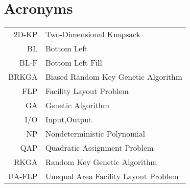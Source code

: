 \documentclass[english,master,unicode]{ctufit-thesis}
\theoremstyle{plain}
\theoremstyle{definition}
\theoremstyle{remark}
\numberwithin{theorem}{chapter}
\begin{document}


    \chapter{Acronyms}\label{ch:acronyms}

    \begin{tabular}{rl}
        2D-KP  & Two-Dimensional Knapsack             \\
        BL     & Bottom Left                          \\
        BL-F   & Bottom Left Fill                     \\
        BRKGA  & Biased Random Key Genetic Algorithm  \\
        FLP    & Facility Layout Problem              \\
        GA     & Genetic Algorithm                    \\
        I/O    & Input,Output                         \\
        NP     & Nondeterministic Polynomial          \\
        QAP    & Quadratic Assignment Problem         \\
        RKGA   & Random Key Genetic Algorithm         \\
        UA-FLP & Unequal Area Facility Layout Problem \\
    \end{tabular}

    \mainmatter\mainmatterinit %



    \printbibliography[heading=bibintoc] %

    \appendix\appendixinit %


    \backmatter %

\end{document}
